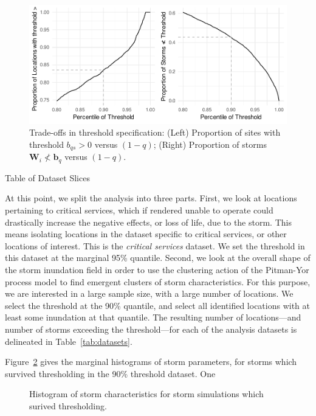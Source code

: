 \begin{figure}[ht]
    \centering
    \caption{Trade-offs in threshold specification:
    (Left) Proportion of sites with threshold $b_{qs} > 0$ versus $(1 - q)$; 
    (Right) Proportion of storms $\bm{W}_i \not< \bm{b}_q$ versus $(1-q)$.
    \label{fig:thresholdselection}}
    \includegraphics[width=0.9\linewidth]{plots/explore_threshold}
\end{figure}

\begin{table}
    \centering
    \caption{Table of Dataset Slices\label{tab:datasets}}    
\end{table}

At this point, we split the analysis into three parts.  First, we look at locations
    pertaining to critical services, which if rendered unable to operate could
    drastically increase the negative effects, or loss of life, due to the storm.
    This means isolating locations in the dataset specific to critical services, or
    other locations of interest.  This is the \emph{critical services} dataset.  We
    set the threshold in this dataset at the marginal 95\% quantile.
    Second, we look at the overall shape of the storm inundation field in order to
    use the clustering action of the Pitman-Yor process model to find emergent clusters
    of storm characteristics.  For this purpose, we are interested in a large sample
    size, with a large number of locations.  We select the threshold at the 90\% quantile, 
    and select all identified locations with at least some inundation at that quantile.
    The resulting number of locations---and number of storms exceeding the threshold---for 
    each of the analysis datasets is delineated in Table~\ref{tab:datasets}.


Figure~\ref{fig:thetahistogram} gives the marginal histograms of storm parameters, for 
    storms which survived thresholding in the 90\% threshold dataset.  One
    
\begin{figure}[ht]
    \centering 
    \caption{Histogram of storm characteristics for storm simulations 
        which surived thresholding.\label{fig:thetahistogram}}
\end{figure}











